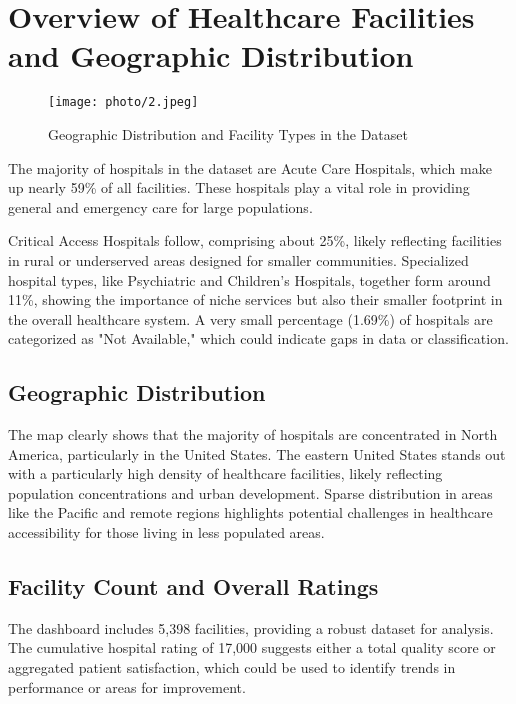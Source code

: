 \section{Overview of Healthcare Facilities and Geographic Distribution}

\begin{figure}[ht]
    \centering
    \texttt{[image: photo/2.jpeg]} %
    \caption{Geographic Distribution and Facility Types in the Dataset}
    \label{fig:facility_distribution}
\end{figure}

The majority of hospitals in the dataset are Acute Care Hospitals, which make up nearly 59\% of all facilities. These hospitals play a vital role in providing general and emergency care for large populations. 

Critical Access Hospitals follow, comprising about 25\%, likely reflecting facilities in rural or underserved areas designed for smaller communities. Specialized hospital types, like Psychiatric and Children’s Hospitals, together form around 11\%, showing the importance of niche services but also their smaller footprint in the overall healthcare system. A very small percentage (1.69\%) of hospitals are categorized as "Not Available," which could indicate gaps in data or classification.

\subsection{Geographic Distribution}
The map clearly shows that the majority of hospitals are concentrated in North America, particularly in the United States. The eastern United States stands out with a particularly high density of healthcare facilities, likely reflecting population concentrations and urban development. Sparse distribution in areas like the Pacific and remote regions highlights potential challenges in healthcare accessibility for those living in less populated areas.

\subsection{Facility Count and Overall Ratings}
The dashboard includes 5,398 facilities, providing a robust dataset for analysis. The cumulative hospital rating of 17,000 suggests either a total quality score or aggregated patient satisfaction, which could be used to identify trends in performance or areas for improvement.

